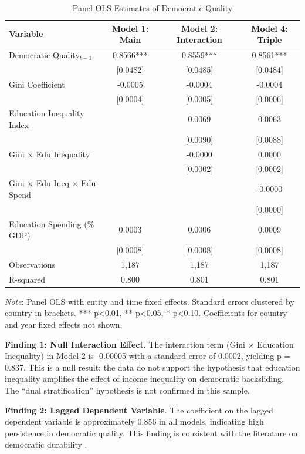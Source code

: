 \documentclass[11pt,letterpaper]{article}
\begin{document}
\begin{table}[!htbp]
  \centering
  \caption{Panel OLS Estimates of Democratic Quality}
  \label{tab:panel_ols}
  \begin{tabular}{lccc}
    \toprule
    Variable & Model 1: Main & Model 2: Interaction & Model 4: Triple \\
    \midrule
    Democratic Quality$_{t-1}$ & 0.8566*** & 0.8559*** & 0.8561*** \\
     & [0.0482] & [0.0485] & [0.0484] \\
    Gini Coefficient & -0.0005 & -0.0004 & -0.0004 \\
     & [0.0004] & [0.0005] & [0.0006] \\
    Education Inequality Index &  & 0.0069 & 0.0063 \\
     &  & [0.0090] & [0.0088] \\
    Gini $\times$ Edu Inequality &  & -0.0000 & 0.0000 \\
     &  & [0.0002] & [0.0002] \\
    Gini $\times$ Edu Ineq $\times$ Edu Spend &  &  & -0.0000 \\
     &  &  & [0.0000] \\
    Education Spending (\% GDP) & 0.0003 & 0.0006 & 0.0009 \\
     & [0.0008] & [0.0008] & [0.0008] \\
    Observations & 1,187 & 1,187 & 1,187 \\
    R-squared & 0.800 & 0.801 & 0.801 \\
    \bottomrule
  \end{tabular}
  \vspace{0.2cm}
  \begin{minipage}{\linewidth}
    \footnotesize \textit{Note}: Panel OLS with entity and time fixed effects. Standard errors clustered by country in brackets. *** p<0.01, ** p<0.05, * p<0.10. Coefficients for country and year fixed effects not shown.
  \end{minipage}
\end{table}

\textbf{Finding 1: Null Interaction Effect}. The interaction term (Gini $\times$ Education Inequality) in Model 2 is -0.00005 with a standard error of 0.0002, yielding p = 0.837. This is a null result: the data do not support the hypothesis that education inequality amplifies the effect of income inequality on democratic backsliding. The ``dual stratification'' hypothesis is not confirmed in this sample.

\textbf{Finding 2: Lagged Dependent Variable}. The coefficient on the lagged dependent variable is approximately 0.856 in all models, indicating high persistence in democratic quality. This finding is consistent with the literature on democratic durability \cite{Przeworski2019}.
\end{document}

